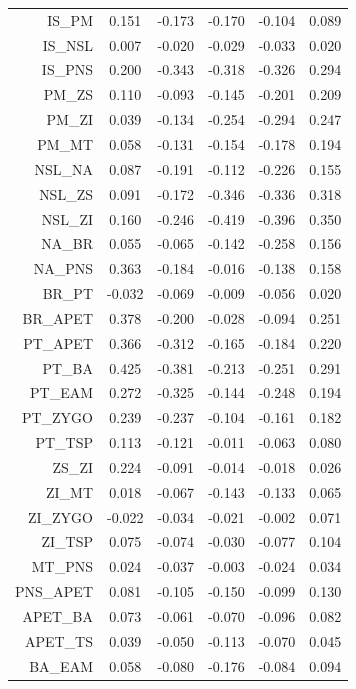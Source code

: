 \begin{refsection}
\begin{table}
\begin{tabular}{rccccc}
        \hline
  IS\_PM & 0.151 & -0.173 & -0.170 & -0.104 & 0.089 \\
  IS\_NSL & 0.007 & -0.020 & -0.029 & -0.033 & 0.020 \\
  IS\_PNS & 0.200 & -0.343 & -0.318 & -0.326 & 0.294 \\
  PM\_ZS & 0.110 & -0.093 & -0.145 & -0.201 & 0.209 \\
  PM\_ZI & 0.039 & -0.134 & -0.254 & -0.294 & 0.247 \\
  PM\_MT & 0.058 & -0.131 & -0.154 & -0.178 & 0.194 \\
  NSL\_NA & 0.087 & -0.191 & -0.112 & -0.226 & 0.155 \\
  NSL\_ZS & 0.091 & -0.172 & -0.346 & -0.336 & 0.318 \\
  NSL\_ZI & 0.160 & -0.246 & -0.419 & -0.396 & 0.350 \\
  NA\_BR & 0.055 & -0.065 & -0.142 & -0.258 & 0.156 \\
  NA\_PNS & 0.363 & -0.184 & -0.016 & -0.138 & 0.158 \\
  BR\_PT & -0.032 & -0.069 & -0.009 & -0.056 & 0.020 \\
  BR\_APET & 0.378 & -0.200 & -0.028 & -0.094 & 0.251 \\
  PT\_APET & 0.366 & -0.312 & -0.165 & -0.184 & 0.220 \\
  PT\_BA & 0.425 & -0.381 & -0.213 & -0.251 & 0.291 \\
  PT\_EAM & 0.272 & -0.325 & -0.144 & -0.248 & 0.194 \\
  PT\_ZYGO & 0.239 & -0.237 & -0.104 & -0.161 & 0.182 \\
  PT\_TSP & 0.113 & -0.121 & -0.011 & -0.063 & 0.080 \\
  ZS\_ZI & 0.224 & -0.091 & -0.014 & -0.018 & 0.026 \\
  ZI\_MT & 0.018 & -0.067 & -0.143 & -0.133 & 0.065 \\
  ZI\_ZYGO & -0.022 & -0.034 & -0.021 & -0.002 & 0.071 \\
  ZI\_TSP & 0.075 & -0.074 & -0.030 & -0.077 & 0.104 \\
  MT\_PNS & 0.024 & -0.037 & -0.003 & -0.024 & 0.034 \\
  PNS\_APET & 0.081 & -0.105 & -0.150 & -0.099 & 0.130 \\
  APET\_BA & 0.073 & -0.061 & -0.070 & -0.096 & 0.082 \\
  APET\_TS & 0.039 & -0.050 & -0.113 & -0.070 & 0.045 \\
  BA\_EAM & 0.058 & -0.080 & -0.176 & -0.084 & 0.094 \\

\end{tabular}
\end{table}
\end{refsection}
